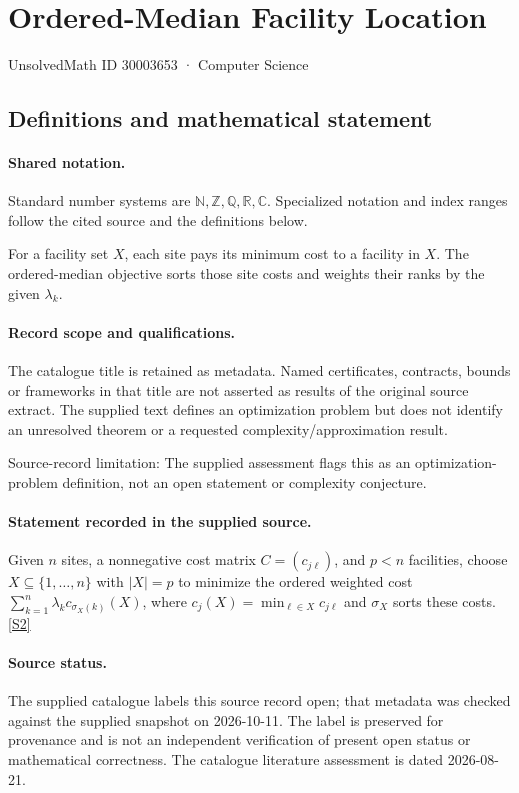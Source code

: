 \documentclass[11pt]{article}
\newcommand{\sref}[2]{\hyperlink{source:#1:#2}{[S#2]}}
\begin{document}
\setcounter{section}{30003652}
\section{Ordered-Median Facility Location}\label{30003653}
{\small\sffamily UnsolvedMath ID 30003653 · Computer Science}
\subsection{Definitions and mathematical statement}

\paragraph{Shared notation.}Standard number systems are $\mathbb N,\mathbb Z,\mathbb Q,\mathbb R,\mathbb C$. Specialized notation and index ranges follow the cited source and the definitions below.


For a facility set $X$, each site pays its minimum cost to a facility in $X$. The ordered-median objective sorts those site costs and weights their ranks by the given $\lambda_k$.
\paragraph{Record scope and qualifications.}
The catalogue title is retained as metadata. Named certificates, contracts, bounds or frameworks in that title are not asserted as results of the original source extract.
The supplied text defines an optimization problem but does not identify an unresolved theorem or a requested complexity/approximation result.

Source-record limitation: The supplied assessment flags this as an optimization-problem definition, not an open statement or complexity conjecture.
\paragraph{Statement recorded in the supplied source.}
Given $n$ sites, a nonnegative cost matrix $C=(c_{j\ell})$, and $p<n$ facilities, choose $X\subseteq\{1,\ldots,n\}$ with $|X|=p$ to minimize the ordered weighted cost $\sum_{k=1}^n\lambda_k c_{\sigma_X(k)}(X)$, where $c_j(X)=\min_{\ell\in X}c_{j\ell}$ and $\sigma_X$ sorts these costs. \sref{30003653}{2}
\paragraph{Source status.}
The supplied catalogue labels this source record open; that metadata was checked against the supplied snapshot on 2026-10-11. The label is preserved for provenance and is not an independent verification of present open status or mathematical correctness. The catalogue literature assessment is dated 2026-08-21.
\end{document}
